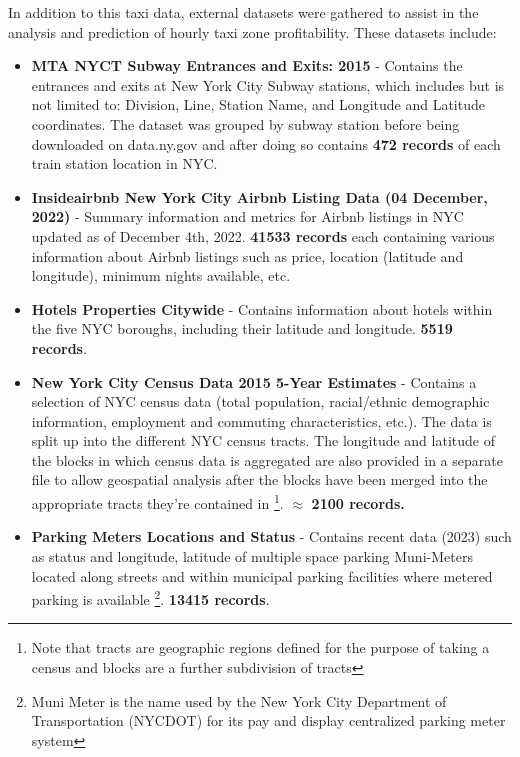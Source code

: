 \documentclass[11pt]{article}
\begin{document}
In addition to this taxi data, external datasets were gathered to assist in the analysis and prediction of hourly taxi zone profitability. These datasets include:
\begin{itemize} 
    \item \textbf{MTA NYCT Subway Entrances and Exits: 2015} - Contains the entrances and exits at New York City Subway stations, which includes but is not limited to: Division, Line, Station Name, and Longitude and Latitude coordinates. The dataset was grouped by subway station before being downloaded on data.ny.gov and after doing so contains \textbf{472 records} of each train station location in NYC. \cite{externalsubway}
    \item \textbf{Insideairbnb New York City Airbnb Listing Data (04 December, 2022)} - Summary information and metrics for Airbnb listings in NYC updated as of December 4th, 2022. \textbf{41533 records} each containing various information about Airbnb listings such as price, location (latitude and longitude), minimum nights available, etc. \cite{externalairbnb}
    \item \textbf{Hotels Properties Citywide} - Contains information about hotels within the five NYC boroughs, including their latitude and longitude. \textbf{5519 records}. \cite{externalhotels}
    \item \textbf{New York City Census Data 2015 5-Year Estimates} - Contains a selection of NYC census data (total population, racial/ethnic demographic information, employment and commuting characteristics, etc.). The data is split up into the different NYC census tracts. The longitude and latitude of the blocks in which census data is aggregated are also provided in a separate file to allow geospatial analysis after the blocks have been merged into the appropriate tracts they're contained in \footnote{Note that tracts are geographic regions defined for the purpose of taking a census and blocks are a further subdivision of tracts}. $\approx$ \textbf{2100 records.} \cite{externalcensus}
    \item \textbf{Parking Meters Locations and Status} - Contains recent data (2023) such as status and longitude, latitude of multiple space parking Muni-Meters located along streets and within municipal parking facilities where metered parking is available \footnote{Muni Meter is the name used by the New York City Department of Transportation (NYCDOT) for its pay and display centralized parking meter system}. \textbf{13415 records}. \cite{externalparking}
\end{itemize} 
\end{document}
